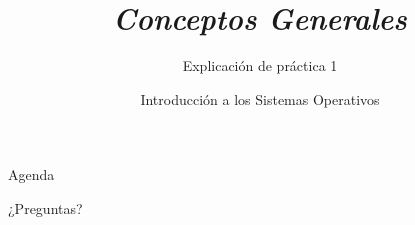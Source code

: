 


\title{\textit{Conceptos Generales}}
\author{Introducción a los Sistemas Operativos}
\subtitle{Explicación de práctica 1}



\begin{frame}
  \titlepage
\end{frame}

\begin{frame}{Agenda}
  \tableofcontents
\end{frame}



\begin{frame}{}
  \begin{center}
    \vfill
    \huge ¿Preguntas?
    \vfill
  \end{center}
\end{frame}

